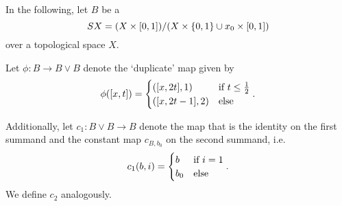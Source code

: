 \begin{myparagraph}
    In the following, let $B$ be a 
    \[ SX = (\cyl{X}) / (X \cross \coll{0, 1} \cup \cyl{x_0})\]
    over a topological space $X$.

    Let $\phi: B \to B \vee B$ denote the `duplicate' map given by
    \[ \phi([x, t]) = \case{([x, 2t], 1)}{([x, 2t - 1], 2)}{t \le \half}. \]

    Additionally, let $c_1: B \vee B \to B$ denote the map
    that is the identity on the first summand
    and the constant map $c_{B, b_0}$ on the second summand, i.e.
    \[ c_1(b, i) = \case{b}{b_0}{i = 1}. \]
    We define $c_2$ analogously.
\end{myparagraph}